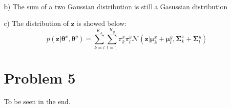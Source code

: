 \documentclass{article}
\begin{document}
b) The sum of a two Gaussian distribution is still a Gasussian distribution

c) The distribution of $\bm{z}$ is showed below:
\begin{equation}
	p(\bm{z}|\bm{\theta}^x, \bm{\theta}^y) = \sum_{k=l}^{K_x} \sum_{l=1}^{K_y} \pi_k^x \pi_l^y \mathcal{N}(\bm{z}|\bm{\mu}_k^x + \bm{\mu}_l^y, \bm{\Sigma}_k^x + \bm{\Sigma}_l^y)
\end{equation}
\section*{Problem 5}
To be seen in the end.

\small


\end{document}
